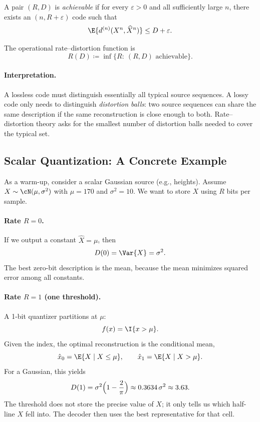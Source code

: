 \begin{definition}[Achievable $(R,D)$]
A pair $(R,D)$ is \emph{achievable} if for every $\varepsilon>0$ and all sufficiently large $n$, there exists an $(n,R+\varepsilon)$ code such that
\[
    \E{d^{(n)}(X^n,\widehat X^n)}\le D+\varepsilon.
\]
\end{definition}

\begin{definition}
The operational rate--distortion function is
\begin{equation}
    R(D)\coloneqq \inf\{R:\ (R,D)\text{ achievable}\}.
\end{equation}
\end{definition}

\paragraph{Interpretation.}
A lossless code must distinguish essentially all typical source sequences.
A lossy code only needs to distinguish \emph{distortion balls}: two source sequences can share the same description if the same reconstruction is close enough to both.
Rate--distortion theory asks for the smallest number of distortion balls needed to cover the typical set.

\subsection{Scalar Quantization: A Concrete Example}
\label{subsec:scalar-quant}

As a warm-up, consider a scalar Gaussian source (e.g., heights).
Assume $X\sim\cN(\mu,\sigma^2)$ with $\mu=170$ and $\sigma^2=10$.
We want to store $X$ using $R$ bits per sample.

\paragraph{Rate $R=0$.}
If we output a constant $\widehat X=\mu$, then
\[
    D(0)=\Var{X}=\sigma^2.
\]
The best zero-bit description is the mean, because the mean minimizes squared error among all constants.

\paragraph{Rate $R=1$ (one threshold).}
A 1-bit quantizer partitions at $\mu$:
\[
    f(x)=\I{x>\mu}.
\]
Given the index, the optimal reconstruction is the conditional mean,
\[
    \hat x_0=\E{X\mid X\le \mu},\qquad
    \hat x_1=\E{X\mid X>\mu}.
\]
For a Gaussian, this yields
\begin{equation}
    D(1)=\sigma^2\Bigl(1-\frac{2}{\pi}\Bigr)\approx 0.3634\,\sigma^2 \approx 3.63.
\end{equation}
The threshold does not store the precise value of $X$; it only tells us which half-line $X$ fell into.
The decoder then uses the best representative for that cell.

